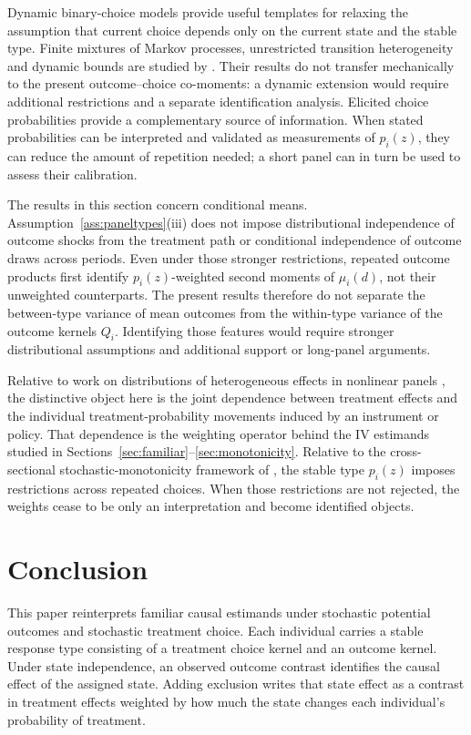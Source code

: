 \documentclass[11pt]{article}
\newcommand{\1}{\mathbf{1}}
\begin{document}
Dynamic binary-choice models provide useful templates for relaxing the assumption that current choice depends only on the current state and the stable type. Finite mixtures of Markov processes, unrestricted transition heterogeneity and dynamic bounds are studied by \citet{kasaharashimotsu2009,browningcarro2014,honoretamer2006,torgovitsky2019}. Their results do not transfer mechanically to the present outcome--choice co-moments: a dynamic extension would require additional restrictions and a separate identification analysis. Elicited choice probabilities provide a complementary source of information. When stated probabilities can be interpreted and validated as measurements of $p_i(z)$, they can reduce the amount of repetition needed; a short panel can in turn be used to assess their calibration.

The results in this section concern conditional means. Assumption~\ref{ass:paneltypes}(iii) does not impose distributional independence of outcome shocks from the treatment path or conditional independence of outcome draws across periods. Even under those stronger restrictions, repeated outcome products first identify $p_i(z)$-weighted second moments of $\mu_i(d)$, not their unweighted counterparts. The present results therefore do not separate the between-type variance of mean outcomes from the within-type variance of the outcome kernels $Q_i$. Identifying those features would require stronger distributional assumptions and additional support or long-panel arguments.

Relative to work on distributions of heterogeneous effects in nonlinear panels \citep{arellanobonhomme2012,chernozhukovetal2013}, the distinctive object here is the joint dependence between treatment effects and the individual treatment-probability movements induced by an instrument or policy. That dependence is the weighting operator behind the IV estimands studied in Sections~\ref{sec:familiar}--\ref{sec:monotonicity}. Relative to the cross-sectional stochastic-monotonicity framework of \citet{small2017}, the stable type $p_i(z)$ imposes restrictions across repeated choices. When those restrictions are not rejected, the weights cease to be only an interpretation and become identified objects.

\section{Conclusion }
\label{sec:conclusion}

This paper reinterprets familiar causal estimands under stochastic potential outcomes and stochastic treatment choice. Each individual carries a stable response type consisting of a treatment choice kernel and an outcome kernel. Under state independence, an observed outcome contrast identifies the causal effect of the assigned state. Adding exclusion writes that state effect as a contrast in treatment effects weighted by how much the state changes each individual's probability of treatment.
\end{document}
